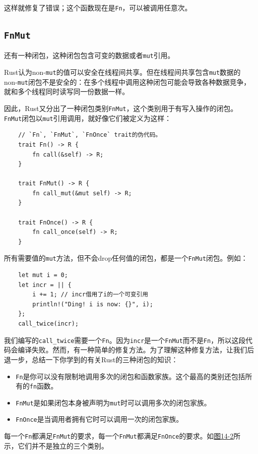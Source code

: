 这样就修复了错误；这个函数现在是\texttt{Fn}，可以被调用任意次。

\subsection{\texttt{FnMut}}
还有一种闭包，这种闭包包含可变的数据或者\texttt{mut}引用。

Rust认为non-\texttt{mut}的值可以安全在线程间共享。但在线程间共享包含\texttt{mut}数据的non-\texttt{mut}闭包不是安全的：在多个线程中调用这种闭包可能会导致各种数据竞争，就和多个线程同时读写同一份数据一样。

因此，Rust又分出了一种闭包类别\texttt{FnMut}，这个类别用于有写入操作的闭包。\texttt{FnMut}闭包以\texttt{mut}引用调用，就好像它们被定义为这样：
\begin{verbatim}
    // `Fn`, `FnMut`, `FnOnce` trait的伪代码。
    trait Fn() -> R {
        fn call(&self) -> R;
    }

    trait FnMut() -> R {
        fn call_mut(&mut self) -> R;
    }

    trait FnOnce() -> R {
        fn call_once(self) -> R;
    }
\end{verbatim}

所有需要值的\texttt{mut}方法，但不会drop任何值的闭包，都是一个\texttt{FnMut}闭包。例如：
\begin{verbatim}
    let mut i = 0;
    let incr = || {
        i += 1; // incr借用了i的一个可变引用
        println!("Ding! i is now: {}", i);
    };
    call_twice(incr);
\end{verbatim}

我们编写的\texttt{call\_twice}需要一个\texttt{Fn}。因为\texttt{incr}是一个\texttt{FnMut}而不是\texttt{Fn}，所以这段代码会编译失败。然而，有一种简单的修复方法。为了理解这种修复方法，让我们后退一步，总结一下你学到的有关Rust的三种闭包的知识：
\begin{itemize}
    \item \texttt{Fn}是你可以没有限制地调用多次的闭包和函数家族。这个最高的类别还包括所有的\texttt{fn}函数。
    \item \texttt{FnMut}是如果闭包本身被声明为\texttt{mut}时可以调用多次的闭包家族。
    \item \texttt{FnOnce}是当调用者拥有它时可以调用一次的闭包家族。
\end{itemize}

每一个\texttt{Fn}都满足\texttt{FnMut}的要求，每一个\texttt{FnMut}都满足\texttt{FnOnce}的要求。如\hyperref[f14-2]{图14-2}所示，它们并不是独立的三个类别。

